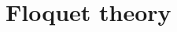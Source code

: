 \documentclass[aps, pre, preprint,unsortedaddress,a4paper,onecolumn]{revtex4}
\newcommand{\vect}[1]{\textbf{\textit{#1}}}
\newcommand{\confaa}[0]{{\alpha_{\textrm{R}}}}
\newcommand{\confab}[0]{{\alpha_{\textrm{R}}'}}
\newcommand{\confba}[0]{{\textrm{C}7_{\textrm{eq}}}}
\newcommand{\confbb}[0]{{\textrm{C}5}}
\newcommand{\confc}[0]{{\alpha_{\textrm{L}}}}
\begin{document}





\section{Floquet theory}
\end{document}
